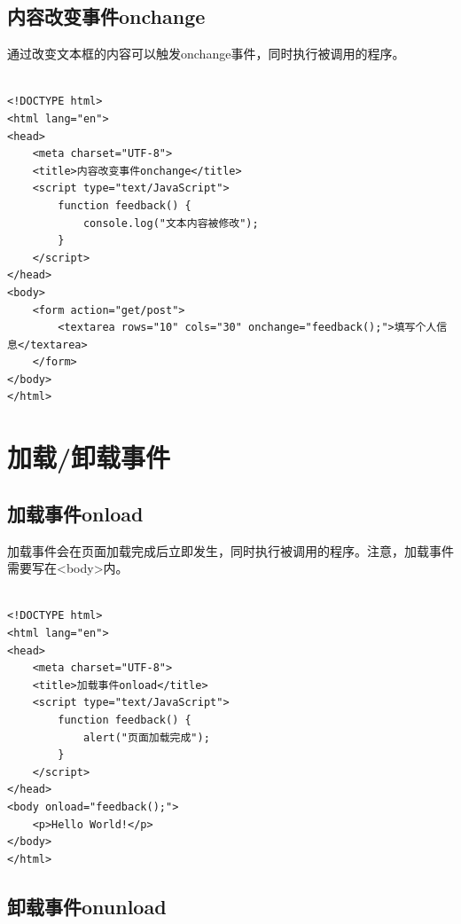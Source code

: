 \subsection{内容改变事件onchange}

通过改变文本框的内容可以触发onchange事件，同时执行被调用的程序。\\

\\

\begin{lstlisting}[style=htmlcssjs]
<!DOCTYPE html>
<html lang="en">
<head>
    <meta charset="UTF-8">
    <title>内容改变事件onchange</title>
    <script type="text/JavaScript">
        function feedback() {
            console.log("文本内容被修改");
        }
    </script>
</head>
<body>
    <form action="get/post">
        <textarea rows="10" cols="30" onchange="feedback();">填写个人信息</textarea>
    </form>
</body>
</html>
\end{lstlisting}

\newpage

\section{加载/卸载事件}

\subsection{加载事件onload}

加载事件会在页面加载完成后立即发生，同时执行被调用的程序。注意，加载事件需要写在<body>内。\\

\\

\begin{lstlisting}[style=htmlcssjs]
<!DOCTYPE html>
<html lang="en">
<head>
    <meta charset="UTF-8">
    <title>加载事件onload</title>
    <script type="text/JavaScript">
        function feedback() {
            alert("页面加载完成");
        }
    </script>
</head>
<body onload="feedback();">
    <p>Hello World!</p>
</body>
</html>
\end{lstlisting}

\vspace{0.5cm}

\subsection{卸载事件onunload}

